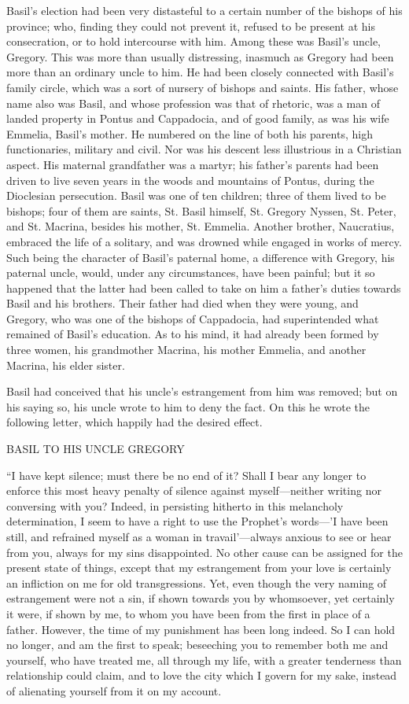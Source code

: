 Basil's election had been very distasteful to a certain number of
the bishops of his province; who, finding they could not prevent it,
refused to be present at his consecration, or to hold intercourse with
him. Among these was Basil's uncle, Gregory. This was more than
usually distressing, inasmuch as Gregory had been more than an
ordinary uncle to him. He had been closely connected with Basil's
family circle, which was a sort of nursery of bishops and saints. His
father, whose name also was Basil, and whose profession was that of
rhetoric, was a man of landed property in Pontus and Cappadocia, and
of good family, as was his wife Emmelia, Basil's mother. He numbered
on the line of both his parents, high functionaries, military and
civil. Nor was his descent less illustrious in a Christian aspect. His
maternal grandfather was a martyr; his father's parents had been
driven to live seven years in the woods and mountains of Pontus,
during the Dioclesian persecution. Basil was one of ten children;
three of them lived to be bishops; four of them are saints, St. Basil
himself, St. Gregory Nyssen, St. Peter, and St. Macrina, besides
his mother, St. Emmelia. Another brother, Naucratius, embraced the
life of a solitary, and was drowned while engaged in works of mercy.
Such being the character of Basil's paternal home, a difference with
Gregory, his paternal uncle, would, under any circumstances, have been
painful; but it so happened that the latter had been called to take on
him a father's duties towards Basil and his brothers. Their father had
died when they were young, and Gregory, who was one of the bishops of
Cappadocia, had superintended what remained of Basil's education. As
to his mind, it had already been formed by three women, his
grandmother Macrina, his mother Emmelia, and another Macrina, his
elder sister.

Basil had conceived that his uncle's estrangement from him was
removed; but on his saying so, his uncle wrote to him to deny the
fact. On this he wrote the following letter, which happily had the
desired effect.

BASIL TO HIS UNCLE GREGORY

``I have kept silence; must there be no end of it? Shall I bear
any longer to enforce this most heavy penalty of silence against
myself—neither writing nor conversing with you? Indeed, in
persisting hitherto in this melancholy determination, I seem to have a
right to use the Prophet's words—'I have been still, and refrained
myself as a woman in travail'—always anxious to see or hear from
you, always for my sins disappointed. No other cause can be assigned
for the present state of things, except that my estrangement from your
love is certainly an infliction on me for old transgressions. Yet,
even though the very naming of estrangement were not a sin, if shown
towards you by whomsoever, yet certainly it were, if shown by me, to
whom you have been from the first in place of a father. However, the
time of my punishment has been long indeed. So I can hold no longer,
and am the first to speak; beseeching you to remember both me and
yourself, who have treated me, all through my life, with a greater
tenderness than relationship could claim, and to love the
city which I govern for my sake, instead of alienating yourself from
it on my account.

